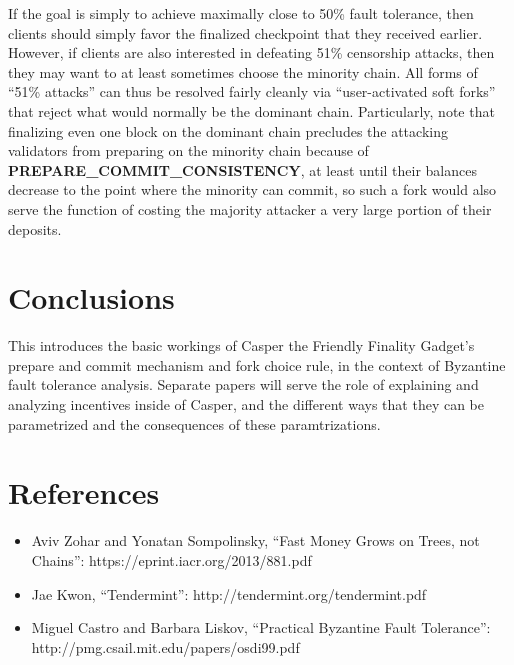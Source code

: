 \documentclass[12pt]{article}
\begin{document}
If the goal is simply to achieve maximally close to 50\% fault tolerance, then clients should simply favor the finalized checkpoint that they received earlier. However, if clients are also interested in defeating 51\% censorship attacks, then they may want to at least sometimes choose the minority chain. All forms of ``51\% attacks'' can thus be resolved fairly cleanly via ``user-activated soft forks'' that reject what would normally be the dominant chain. Particularly, note that finalizing even one block on the dominant chain precludes the attacking validators from preparing on the minority chain because of \textbf{PREPARE\_COMMIT\_CONSISTENCY}, at least until their balances decrease to the point where the minority can commit, so such a fork would also serve the function of costing the majority attacker a very large portion of their deposits.

\section{Conclusions}

This introduces the basic workings of Casper the Friendly Finality Gadget's prepare and commit mechanism and fork choice rule, in the context of Byzantine fault tolerance analysis. Separate papers will serve the role of explaining and analyzing incentives inside of Casper, and the different ways that they can be parametrized and the consequences of these paramtrizations.

\section{References}


\begin{itemize}
\item Aviv Zohar and Yonatan Sompolinsky, ``Fast Money Grows on Trees, not Chains'': https://eprint.iacr.org/2013/881.pdf
\item Jae Kwon, ``Tendermint'': http://tendermint.org/tendermint.pdf
\item Miguel Castro and Barbara Liskov, ``Practical Byzantine Fault Tolerance'': http://pmg.csail.mit.edu/papers/osdi99.pdf 
\end{itemize}
\end{document}
